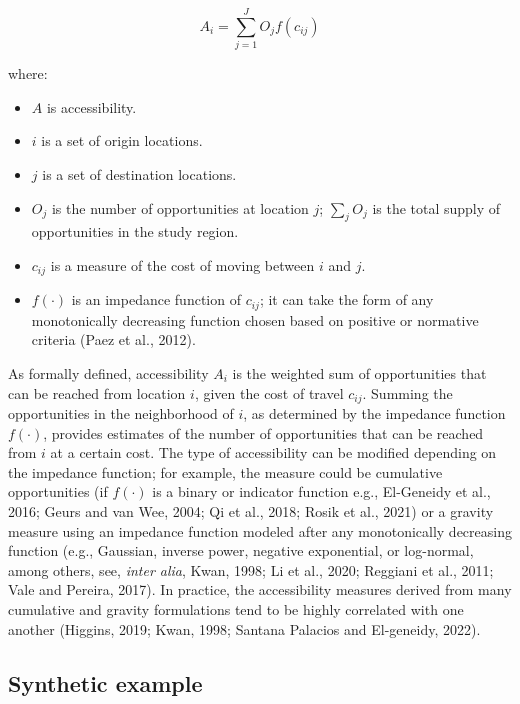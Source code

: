 \documentclass[]{elsarticle} %
\providecommand{\tightlist}{%
  \setlength{\itemsep}{0pt}\setlength{\parskip}{0pt}}
\begin{document}
\begin{equation}
\label{eq:conventional-accessibility}
A_i = \sum_{j=1}^JO_jf(c_{ij})
\end{equation}

\noindent where:

\begin{itemize}
\tightlist
\item
  \(A\) is accessibility.
\item
  \(i\) is a set of origin locations.
\item
  \(j\) is a set of destination locations.
\item
  \(O_j\) is the number of opportunities at location \(j\);
  \(\sum_j O_j\) is the total supply of opportunities in the study
  region.
\item
  \(c_{ij}\) is a measure of the cost of moving between \(i\) and \(j\).
\item
  \(f(\cdot)\) is an impedance function of \(c_{ij}\); it can take the
  form of any monotonically decreasing function chosen based on positive
  or normative criteria (Paez et al., 2012).
\end{itemize}

As formally defined, accessibility \(A_i\) is the weighted sum of
opportunities that can be reached from location \(i\), given the cost of
travel \(c_{ij}\). Summing the opportunities in the neighborhood of
\(i\), as determined by the impedance function \(f(\cdot)\), provides
estimates of the number of opportunities that can be reached from \(i\)
at a certain cost. The type of accessibility can be modified depending
on the impedance function; for example, the measure could be cumulative
opportunities (if \(f(\cdot)\) is a binary or indicator function e.g.,
El-Geneidy et al., 2016; Geurs and van Wee, 2004; Qi et al., 2018; Rosik
et al., 2021) or a gravity measure using an impedance function modeled
after any monotonically decreasing function (e.g., Gaussian, inverse
power, negative exponential, or log-normal, among others, see,
\emph{inter alia}, Kwan, 1998; Li et al., 2020; Reggiani et al., 2011;
Vale and Pereira, 2017). In practice, the accessibility measures derived
from many cumulative and gravity formulations tend to be highly
correlated with one another (Higgins, 2019; Kwan, 1998; Santana Palacios
and El-geneidy, 2022).

\hypertarget{accessibility-numerical-example}{%
\subsection{Synthetic example}\label{accessibility-numerical-example}}
\end{document}
